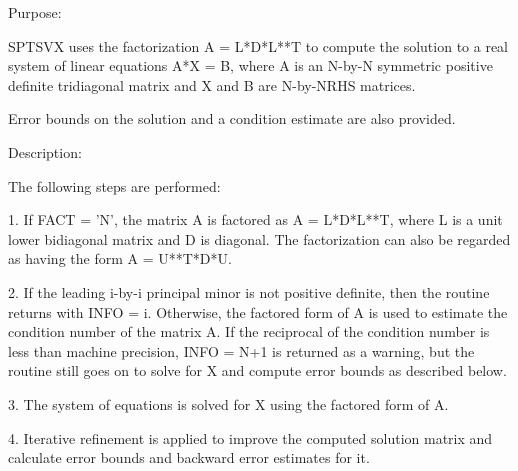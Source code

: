  \begin{DoxyParagraph}{Purpose\+: }
\begin{DoxyVerb} SPTSVX uses the factorization A = L*D*L**T to compute the solution
 to a real system of linear equations A*X = B, where A is an N-by-N
 symmetric positive definite tridiagonal matrix and X and B are
 N-by-NRHS matrices.

 Error bounds on the solution and a condition estimate are also
 provided.\end{DoxyVerb}
 
\end{DoxyParagraph}
\begin{DoxyParagraph}{Description\+: }
\begin{DoxyVerb} The following steps are performed:

 1. If FACT = 'N', the matrix A is factored as A = L*D*L**T, where L
    is a unit lower bidiagonal matrix and D is diagonal.  The
    factorization can also be regarded as having the form
    A = U**T*D*U.

 2. If the leading i-by-i principal minor is not positive definite,
    then the routine returns with INFO = i. Otherwise, the factored
    form of A is used to estimate the condition number of the matrix
    A.  If the reciprocal of the condition number is less than machine
    precision, INFO = N+1 is returned as a warning, but the routine
    still goes on to solve for X and compute error bounds as
    described below.

 3. The system of equations is solved for X using the factored form
    of A.

 4. Iterative refinement is applied to improve the computed solution
    matrix and calculate error bounds and backward error estimates
    for it.\end{DoxyVerb}
 
\end{DoxyParagraph}

